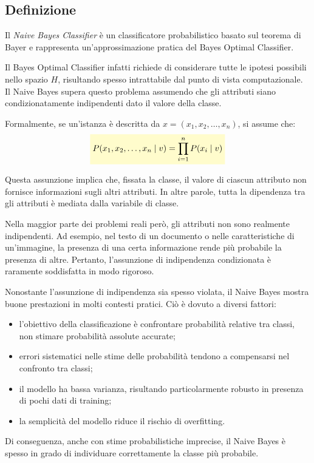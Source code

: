 \documentclass[a4paper,12pt]{report}
\newcommand{\highlight}[1]{%
\colorbox{yellow!20}{$\displaystyle #1$}%
}
\begin{document}
\subsection{Definizione}

Il \textit{Naive Bayes Classifier} è un classificatore probabilistico basato sul teorema di Bayer e rappresenta un’approssimazione pratica del Bayes Optimal Classifier.

Il Bayes Optimal Classifier infatti richiede di considerare tutte le ipotesi possibili nello spazio \( H \), risultando spesso intrattabile dal punto di vista computazionale.
Il Naive Bayes supera questo problema assumendo che gli attributi siano condizionatamente indipendenti dato il valore della classe.

Formalmente, se un’istanza è descritta da \( x = (x_1, x_2, \dots, x_n) \), si assume che:
\[
\highlight{
P(x_1, x_2, \dots, x_n \mid v)
= \prod_{i=1}^{n} P(x_i \mid v)}
\]

Questa assunzione implica che, fissata la classe, il valore di ciascun attributo non fornisce informazioni sugli altri attributi.
In altre parole, tutta la dipendenza tra gli attributi è mediata dalla variabile di classe.

Nella maggior parte dei problemi reali però, gli attributi non sono realmente indipendenti.
Ad esempio, nel testo di un documento o nelle caratteristiche di un’immagine, la presenza di una certa informazione rende più probabile la presenza di altre.
Pertanto, l’assunzione di indipendenza condizionata è raramente soddisfatta in modo rigoroso.

Nonostante l’assunzione di indipendenza sia spesso violata, il Naive Bayes mostra buone prestazioni in molti contesti pratici.
Ciò è dovuto a diversi fattori:

\begin{itemize}
    \item l’obiettivo della classificazione è confrontare probabilità relative tra classi, non stimare probabilità assolute accurate;
    \item errori sistematici nelle stime delle probabilità tendono a compensarsi nel confronto tra classi;
    \item il modello ha bassa varianza, risultando particolarmente robusto in presenza di pochi dati di training;
    \item la semplicità del modello riduce il rischio di overfitting.
\end{itemize}

Di conseguenza, anche con stime probabilistiche imprecise, il Naive Bayes è spesso in grado di individuare correttamente la classe più probabile.
\end{document}
